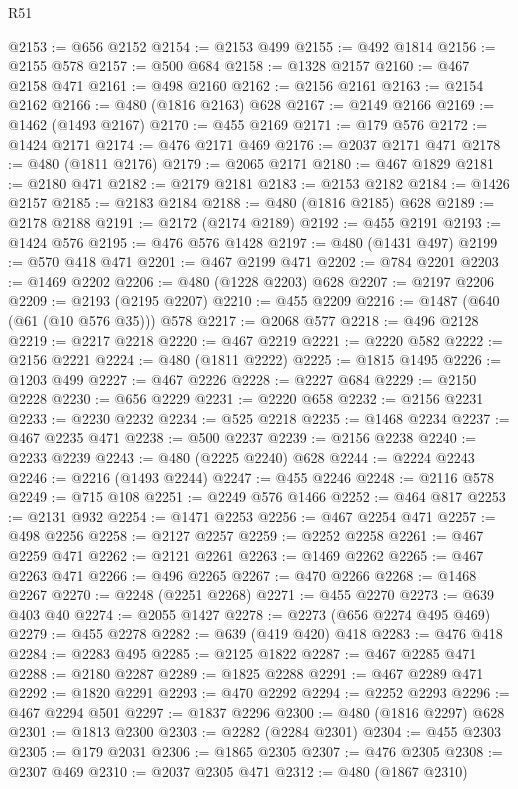 \begin{lexlean}{R51}
\begin{coremodule}
@2153 := @656 @2152
@2154 := @2153 @499
@2155 := @492 @1814
@2156 := @2155 @578
@2157 := @500 @684
@2158 := @1328 @2157
@2160 := @467 @2158 @471
@2161 := @498 @2160
@2162 := @2156 @2161
@2163 := @2154 @2162
@2166 := @480 (@1816 @2163) @628
@2167 := @2149 @2166
@2169 := @1462 (@1493 @2167)
@2170 := @455 @2169
@2171 := @179 @576
@2172 := @1424 @2171
@2174 := @476 @2171 @469
@2176 := @2037 @2171 @471
@2178 := @480 (@1811 @2176)
@2179 := @2065 @2171
@2180 := @467 @1829
@2181 := @2180 @471
@2182 := @2179 @2181
@2183 := @2153 @2182
@2184 := @1426 @2157
@2185 := @2183 @2184
@2188 := @480 (@1816 @2185) @628
@2189 := @2178 @2188
@2191 := @2172 (@2174 @2189)
@2192 := @455 @2191
@2193 := @1424 @576
@2195 := @476 @576 @1428
@2197 := @480 (@1431 @497)
@2199 := @570 @418 @471
@2201 := @467 @2199 @471
@2202 := @784 @2201
@2203 := @1469 @2202
@2206 := @480 (@1228 @2203) @628
@2207 := @2197 @2206
@2209 := @2193 (@2195 @2207)
@2210 := @455 @2209
@2216 := @1487 (@640 (@61 (@10 @576 @35))) @578
@2217 := @2068 @577
@2218 := @496 @2128
@2219 := @2217 @2218
@2220 := @467 @2219
@2221 := @2220 @582
@2222 := @2156 @2221
@2224 := @480 (@1811 @2222)
@2225 := @1815 @1495
@2226 := @1203 @499
@2227 := @467 @2226
@2228 := @2227 @684
@2229 := @2150 @2228
@2230 := @656 @2229
@2231 := @2220 @658
@2232 := @2156 @2231
@2233 := @2230 @2232
@2234 := @525 @2218
@2235 := @1468 @2234
@2237 := @467 @2235 @471
@2238 := @500 @2237
@2239 := @2156 @2238
@2240 := @2233 @2239
@2243 := @480 (@2225 @2240) @628
@2244 := @2224 @2243
@2246 := @2216 (@1493 @2244)
@2247 := @455 @2246
@2248 := @2116 @578
@2249 := @715 @108
@2251 := @2249 @576 @1466
@2252 := @464 @817
@2253 := @2131 @932
@2254 := @1471 @2253
@2256 := @467 @2254 @471
@2257 := @498 @2256
@2258 := @2127 @2257
@2259 := @2252 @2258
@2261 := @467 @2259 @471
@2262 := @2121 @2261
@2263 := @1469 @2262
@2265 := @467 @2263 @471
@2266 := @496 @2265
@2267 := @470 @2266
@2268 := @1468 @2267
@2270 := @2248 (@2251 @2268)
@2271 := @455 @2270
@2273 := @639 @403 @40
@2274 := @2055 @1427
@2278 := @2273 (@656 @2274 @495 @469)
@2279 := @455 @2278
@2282 := @639 (@419 @420) @418
@2283 := @476 @418
@2284 := @2283 @495
@2285 := @2125 @1822
@2287 := @467 @2285 @471
@2288 := @2180 @2287
@2289 := @1825 @2288
@2291 := @467 @2289 @471
@2292 := @1820 @2291
@2293 := @470 @2292
@2294 := @2252 @2293
@2296 := @467 @2294 @501
@2297 := @1837 @2296
@2300 := @480 (@1816 @2297) @628
@2301 := @1813 @2300
@2303 := @2282 (@2284 @2301)
@2304 := @455 @2303
@2305 := @179 @2031
@2306 := @1865 @2305
@2307 := @476 @2305
@2308 := @2307 @469
@2310 := @2037 @2305 @471
@2312 := @480 (@1867 @2310)

\end{coremodule}
\end{lexlean}
